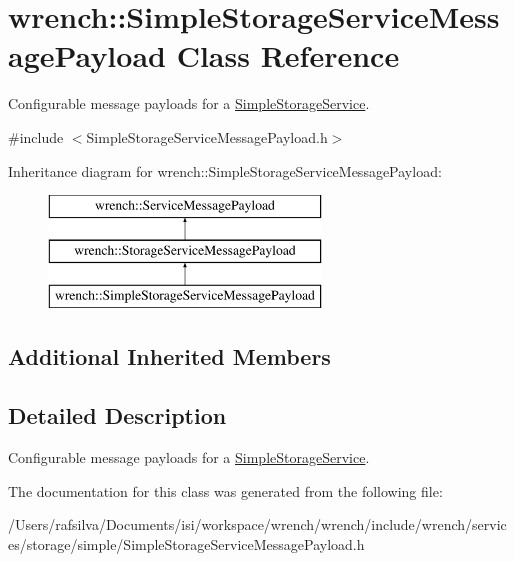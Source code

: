 \hypertarget{classwrench_1_1_simple_storage_service_message_payload}{}\section{wrench\+:\+:Simple\+Storage\+Service\+Message\+Payload Class Reference}
\label{classwrench_1_1_simple_storage_service_message_payload}


Configurable message payloads for a \hyperlink{classwrench_1_1_simple_storage_service}{Simple\+Storage\+Service}.  




{\ttfamily \#include $<$Simple\+Storage\+Service\+Message\+Payload.\+h$>$}

Inheritance diagram for wrench\+:\+:Simple\+Storage\+Service\+Message\+Payload\+:\begin{figure}[H]
\begin{center}
\leavevmode
\includegraphics[height=3.000000cm]{classwrench_1_1_simple_storage_service_message_payload}
\end{center}
\end{figure}
\subsection*{Additional Inherited Members}


\subsection{Detailed Description}
Configurable message payloads for a \hyperlink{classwrench_1_1_simple_storage_service}{Simple\+Storage\+Service}. 

The documentation for this class was generated from the following file\+:\begin{DoxyCompactItemize}
\item 
/\+Users/rafsilva/\+Documents/isi/workspace/wrench/wrench/include/wrench/services/storage/simple/Simple\+Storage\+Service\+Message\+Payload.\+h\end{DoxyCompactItemize}

